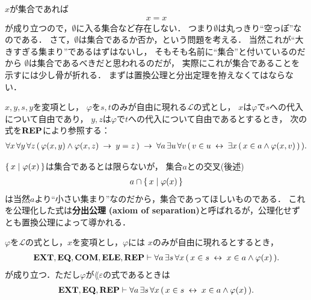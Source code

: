 	$x$が集合であれば
	\begin{align}
		x = x
	\end{align}
	が成り立つので，$\emptyset$に入る集合など存在しない．
	つまり$\emptyset$は丸っきり``空っぽ''なのである．
	さて，$\emptyset$は集合であるか否か，という問題を考える．
	当然これが``大きすぎる集まり''であるはずはないし，
	そもそも名前に``集合''と付いているのだから
	$\emptyset$は集合であるべきだと思われるのだが，
	実際にこれが集合であることを示すには少し骨が折れる．
	まずは置換公理と分出定理を拵えなくてはならない．
	
	\begin{screen}
		\begin{axm}[置換公理]
			$x,y,s,y$を変項とし，
			$\varphi$を$s,t$のみが自由に現れる$\mathcal{L}$の式とし，
			$x$は$\varphi$で$s$への代入について自由であり，
			$y,z$は$\varphi$で$t$への代入について自由であるとするとき，
			次の式を$\mbox{{\bf REP}}$により参照する：
			\begin{align}
				\forall x\, \forall y\, \forall z\, 
				(\, \varphi(x,y) \wedge \varphi(x,z)
				\hspace{0.25em}\rightarrow\hspace{0.25em} y = z\, )
				\hspace{0.25em}\rightarrow\hspace{0.25em} \forall a\, \exists u\, \forall v\,
				(\, v \in u \hspace{0.25em}\leftrightarrow\hspace{0.25em} \exists x\, (\, x \in a \wedge 
				\varphi(x,v)\, )\, ).
			\end{align}
		\end{axm}
	\end{screen}
	
	$\{\, x \mid \varphi(x)\, \}$は集合であるとは限らないが，
	集合$a$との交叉(後述)
	\begin{align}
		a \cap \{\, x \mid \varphi(x)\, \}
	\end{align}
	は当然$a$より``小さい集まり''なのだから，集合であってほしいものである．
	これを公理化した式は{\bf 分出公理}\index{ぶんしゅつこうり@分出公理}
	{\bf (axiom of separation)}と呼ばれるが，公理化せずとも置換公理によって導かれる．
	
	\begin{screen}
		\begin{thm}[分出定理]\label{thm:axiom_of_separation}
			$\varphi$を$\mathcal{L}$の式とし，$x$を変項とし，$\varphi$には
			$x$のみが自由に現れるとするとき，
			\begin{align}
				\mbox{{\bf EXT}},\mbox{{\bf EQ}},\mbox{\bf COM},\mbox{{\bf ELE}},\mbox{{\bf REP}} \vdash 
				\forall a\, \exists s\, \forall x\,
				(\, x \in s \hspace{0.25em}\leftrightarrow\hspace{0.25em} x \in a \wedge \varphi(x)\, ).
				\label{fom:thm_axiom_of_separation_0}
			\end{align}
			が成り立つ．ただし$\varphi$が$\lang{\varepsilon}$の式であるときは
			\begin{align}
				\mbox{{\bf EXT}},\mbox{{\bf EQ}},\mbox{{\bf REP}} \vdash 
				\forall a\, \exists s\, \forall x\,
				(\, x \in s \hspace{0.25em}\leftrightarrow\hspace{0.25em} x \in a \wedge \varphi(x)\, ).
			\end{align}
		\end{thm}
	\end{screen}
	
